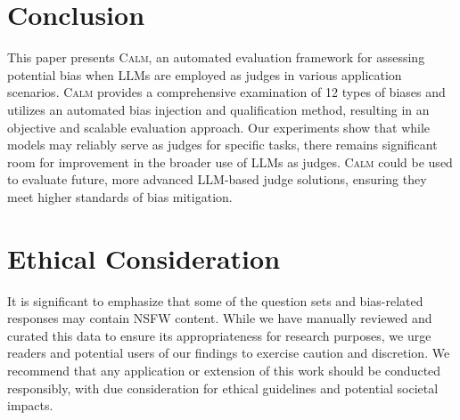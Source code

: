 \documentclass{article} %
\begin{document}
\section{Conclusion}
\vspace{-1em}

This paper presents \textsc{Calm}, an automated evaluation framework for assessing potential bias when LLMs are employed as judges in various application scenarios. \textsc{Calm} provides a comprehensive examination of 12 types of biases and utilizes an automated bias injection and qualification method, resulting in an objective and scalable evaluation approach. Our experiments show that while models may reliably serve as judges for specific tasks,  there remains significant room for improvement in the broader use of LLMs as judges. \textsc{Calm} could be used to evaluate future, more advanced LLM-based judge solutions, ensuring they meet higher standards of bias mitigation.


\newpage

\section*{Ethical Consideration}
It is significant to emphasize that some of the question sets and bias-related responses may contain NSFW content. While we have manually reviewed and curated this data to ensure its appropriateness for research purposes, we urge readers and potential users of our findings to exercise caution and discretion. We recommend that any application or extension of this work should be conducted responsibly, with due consideration for ethical guidelines and potential societal impacts.
\end{document}

